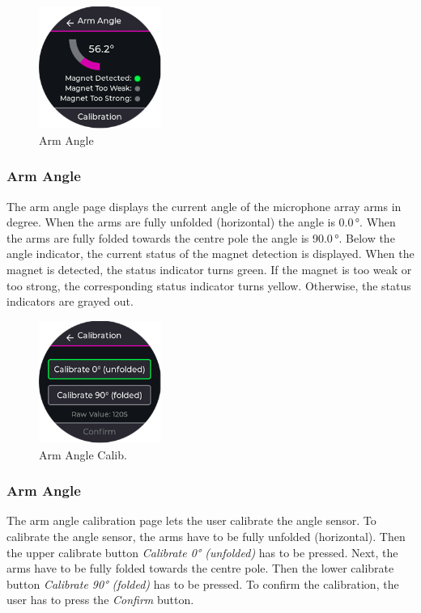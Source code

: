 \begin{minipage}{\linewidth}
	\begin{figure}
		\vspace{-0.6cm}
		\includegraphics[width=4cm]{images/6_design_final/gui/10_angle_sensor.png}
		\centering
		\caption{Arm Angle}
		\label{fig:final_design_gui_arm_angle}
	\end{figure}
	\subsubsection{Arm Angle}
	The arm angle page displays the current angle of the microphone array arms in degree.
	When the arms are fully unfolded (horizontal) the angle is 0.0\,°.
	When the arms are fully folded towards the centre pole the angle is 90.0\,°.
	Below the angle indicator, the current status of the magnet detection is displayed.
	When the magnet is detected, the status indicator turns green.
	If the magnet is too weak or too strong, the corresponding status indicator turns yellow.
	Otherwise, the status indicators are grayed out.
\end{minipage}
\pagebreak

\begin{minipage}{\linewidth}
	\begin{figure}
		\vspace{-0.6cm}
		\includegraphics[width=4cm]{images/6_design_final/gui/11_angle_sensor_calibration.png}
		\centering
		\caption{Arm Angle Calib.}
		\label{fig:final_design_gui_arm_angle_calibration}
	\end{figure}
	\subsubsection{Arm Angle}
	The arm angle calibration page lets the user calibrate the angle sensor.
	To calibrate the angle sensor, the arms have to be fully unfolded (horizontal).
	Then the upper calibrate button \textit{Calibrate 0° (unfolded)} has to be pressed.
	Next, the arms have to be fully folded towards the centre pole.
	Then the lower calibrate button \textit{Calibrate 90° (folded)} has to be pressed.
	To confirm the calibration, the user has to press the \textit{Confirm} button.
\end{minipage}
\vspace{0.0cm}

